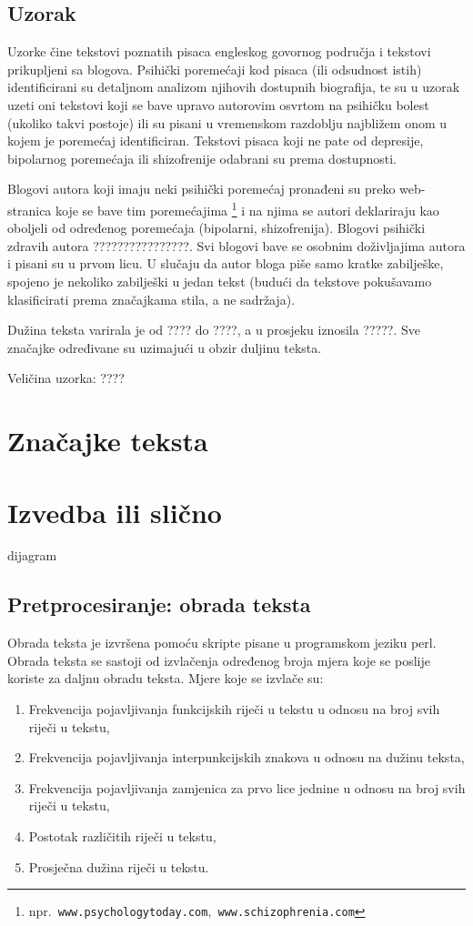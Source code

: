 \documentclass[10pt, a4paper]{article}
\begin{document}
\subsection{Uzorak}
Uzorke čine tekstovi poznatih pisaca engleskog govornog područja i tekstovi prikupljeni sa blogova. Psihički poremećaji kod pisaca (ili odsudnost istih) identificirani su detaljnom analizom njihovih dostupnih biografija, te su u uzorak uzeti oni tekstovi koji se bave upravo autorovim osvrtom na psihičku bolest (ukoliko takvi postoje) ili su pisani u vremenskom razdoblju najbližem onom u kojem je poremećaj identificiran. Tekstovi pisaca koji ne pate od depresije, bipolarnog poremećaja ili shizofrenije odabrani su prema dostupnosti.

Blogovi autora koji imaju neki psihički poremećaj pronađeni su preko web-stranica koje se bave tim poremećajima \footnote{npr.~\texttt{www.psychologytoday.com},\texttt{ www.schizophrenia.com}} i na njima se autori deklariraju kao oboljeli od određenog poremećaja (bipolarni, shizofrenija). Blogovi psihički zdravih autora ????????????????. Svi blogovi bave se osobnim doživljajima autora i pisani su u prvom licu. U slučaju da autor bloga piše samo kratke zabilješke, spojeno je nekoliko zabilješki u jedan tekst (budući da tekstove pokušavamo klasificirati prema značajkama stila, a ne sadržaja).
 
Dužina teksta varirala je od ???? do ????, a u prosjeku iznosila ?????. Sve značajke određivane su uzimajući u obzir duljinu teksta. 

Veličina uzorka: ????




\section{Značajke teksta}

\section{Izvedba ili slično}
dijagram

\subsection{Pretprocesiranje: obrada teksta}



Obrada teksta je izvršena pomoću skripte pisane u programskom jeziku perl. Obrada teksta se sastoji od izvlačenja određenog broja mjera koje se poslije koriste za daljnu obradu teksta.
Mjere koje se izvlače su:
\begin{enumerate}
\item Frekvencija pojavljivanja funkcijskih riječi u tekstu u odnosu na broj svih riječi u tekstu,
\item Frekvencija pojavljivanja interpunkcijskih znakova u odnosu na dužinu teksta,
\item Frekvencija pojavljivanja zamjenica za prvo lice jednine u odnosu na broj svih riječi u tekstu,
\item Postotak različitih riječi u tekstu,
\item Prosječna dužina riječi u tekstu.
\end{enumerate}
\end{document}
